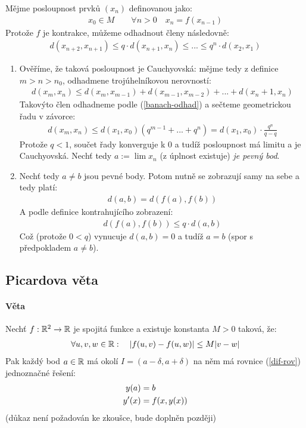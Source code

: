 \documentclass[a4paper,10pt]{article}
\begin{document}
Mějme posloupnost prvků $(x_n)$ definovanou jako:
\begin{align*}
	x_0 \in M \qquad
	\forall n > 0 \quad x_n = f(x_{n-1})
\end{align*}
Protože $f$ je kontrakce, můžeme odhadnout členy následovně:
\begin{align}
	\label{banach-odhad}	d(x_{n+2}, x_{n+1}) \le q \cdot d(x_{n+1}, x_n) \le ... \le q^n \cdot d(x_2,
	x_1)
\end{align}
\begin{enumerate}
\item
Ověříme, že taková posloupnost je Cauchyovská: mějme tedy z definice $m > n >
n_0$, odhadmene trojúhelníkovou nerovností:
\begin{align}
	d(x_m, x_n) \le d(x_m, x_{m-1}) + d(x_{m-1}, x_{m-2}) + ... + d(x_n+1, x_n)
\end{align}
Takovýto člen odhadneme podle (\ref{banach-odhad}) a sečteme geometrickou řadu v
závorce:
\begin{align}
	d(x_m, x_n) \le d(x_1, x_0)( q^{m-1} + ... + q^n ) = d(x_1, x_0) \cdot
	\frac{q^n}{q-q}
\end{align}
Protože $q < 1$, součet řady konverguje k $0$ a tudíž posloupnost má limitu a je
Cauchyovská. Nechť tedy $a := \lim x_n$ (z úplnost existuje) \textit{je pevný
bod}.
\item Nechť tedy $a \neq b$ jsou pevné body. Potom nutně se zobrazují samy na
sebe a tedy platí:
\begin{align}
	d(a,b) = d(f(a), f(b))
\end{align}
A podle definice kontrahujícího zobrazení:
\begin{align}
	d(f(a), f(b)) \le q \cdot d(a, b)
\end{align}
Což (protože $0 \lt q$) vynucuje $d(a,b) = 0$ a tudíž $a = b$ (spor s
předpokladem $a \neq b$).
\end{enumerate}

\subsection{Picardova věta}
\setcounter{equation}{0}
\paragraph{Věta}
Nechť $f: \mathbb{R}^2 \to \mathbb{R}$ je spojitá funkce a existuje konstanta $M > 0$ taková,
že:
\begin{align*}
	\forall u,v,w \in \mathbb{R}: \quad |f(u,v) - f(u,w)| \le M|v-w|
\end{align*}
Pak každý bod $a \in \mathbb{R}$ má okolí $I = (a - \delta, a + \delta)$ na něm má
rovnice (\ref{dif-rov}) jednoznačné řešení:
\begin{align}
	\label{dif-rov} y(a) &= b \\
	y'(x) &= f(x, y(x)) \notag
\end{align}
(důkaz není požadován ke zkoušce, bude doplněn později)
\end{document}
